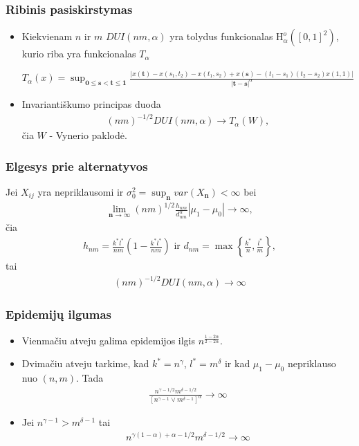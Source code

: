 \documentclass[utf8,hyperref={unicode}]{beamer}
\theoremstyle{change}\newtheorem{teorema}{Teiginys}
\theoremstyle{change}\newtheorem{salyga}{}
\newcommand{\HH}{\mathrm{H}} %
\newcommand{\Hao}{\HH_{\alpha}^o}
\begin{document}
\begin{frame}
    \frametitle{Ribinis pasiskirstymas} 
    \begin{itemize}
	\item Kiekvienam $n$ ir $m$ $DUI(nm,\alpha)$ yra tolydus funkcionalas
	    $\Hao([0,1]^2)$, kurio riba yra funkcionalas $T_\alpha$
	   \begin{center}
		$T_{\alpha}(x)=\sup_{\bm{0}\le \bm{s}<\bm{t}\le
		\bm{1}}\frac{|x(\bm{t})-x(s_1,t_2)-x(t_1,s_2)+x(\bm{s})-(t_1-s_1)(t_2-s_2)x(1,1)|}{|\bm{t}-\bm{s}|^\alpha}$
	    \end{center}
	\item Invariantiškumo principas duoda	
	    \begin{align*}
		(nm)^{-1/2}DUI(nm,\alpha)\to T_{\alpha}(W),
	    \end{align*}
	čia $W$ - Vynerio paklodė.
    \end{itemize}
\end{frame}
\begin{frame}
    \frametitle{Elgesys prie alternatyvos} 
    Jei $X_{ij}$ yra nepriklausomi ir
    $\sigma_0^2=\sup_{\bm{n}}var(X_{\bm{n}})<\infty$ bei
    \begin{align*}%
	\lim_{\bm{n}\to\infty}
	(nm)^{1/2}\frac{h_{nm}}{d_{nm}^\alpha}|\mu_1-\mu_0|\to\infty, 
    \end{align*}
čia
    \begin{align*}
	h_{nm}=\frac{k^*l^*}{nm}\left(1-\frac{k^*l^*}{nm}\right) 
	\text{ ir }
	d_{nm}=\max\left\{\frac{k^*}{n},\frac{l^*}{m}\right\},
    \end{align*}
tai
\begin{align*}%
    (nm)^{-1/2}DUI(nm,\alpha)\to\infty
\end{align*}

\end{frame}

\begin{frame}
    \frametitle{Epidemijų ilgumas} 
    \begin{itemize}
	\item Vienmačiu atveju galima epidemijos ilgis $n^{\frac{1-2\alpha}{2-2\alpha}}$.
	\item Dvimačiu atveju tarkime, kad  $k^*=n^\gamma$, 
$l^*=m^\delta$ ir kad $\mu_1-\mu_0$ nepriklauso nuo $(n,m)$. Tada
    \begin{align*}
     \frac{n^{\gamma-1/2}m^{\delta-1/2}}{[n^{\gamma-1}\vee
     m^{\delta-1}]^\alpha}\to \infty
	\end{align*}
    \item Jei $n^{\gamma-1}>m^{\delta-1}$ tai
\begin{align*}
    n^{\gamma(1-\alpha)+\alpha-1/2} m^{\delta-1/2}\to\infty
\end{align*}
   \end{itemize}
\end{frame}
\end{document}
